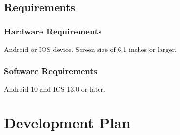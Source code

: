 \documentclass[12pt]{article}
\begin{document}
\subsection{Requirements}

\subsubsection{Hardware Requirements}

Android or IOS device. Screen size of 6.1 inches or larger.

\subsubsection{Software Requirements}

Android 10 and IOS 13.0 or later.

\section{Development Plan}
\end{document}
